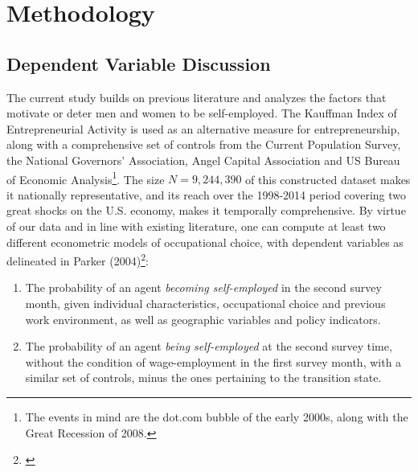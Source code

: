 \chapter{Methodology\label{ch:methods}}


\section {Dependent Variable Discussion}

The current study builds on previous literature and analyzes the factors that motivate or deter men and women to be self-employed. The Kauffman Index of Entrepreneurial Activity is used as an alternative measure for entrepreneurship, along with a comprehensive set of controls from the Current Population Survey, the National Governors' Association,  Angel Capital Association and US Bureau of Economic Analysis\footnote{The events in mind are the dot.com bubble of the early 2000s, along with the Great Recession of 2008.}. The size $N = 9,244,390$ of this constructed dataset makes it nationally representative, and its reach over the 1998-2014 period covering two great shocks on the U.S. economy, makes it temporally comprehensive. By virtue of our data and in line with existing literature, one can compute at least two different econometric models of occupational choice, with dependent variables as delineated in Parker (2004)\footnote{\cite{Parker2004}}: 
\begin{enumerate}
\item The probability of an agent \textit{becoming self-employed} in the second survey month, given individual characteristics, occupational choice and previous work environment, as well as geographic variables and policy indicators.
\item The probability of an agent \textit{being self-employed} at the second survey time, without the condition of wage-employment in the first survey month, with a similar set of controls, minus the ones pertaining to the transition state. 
\end{enumerate}
